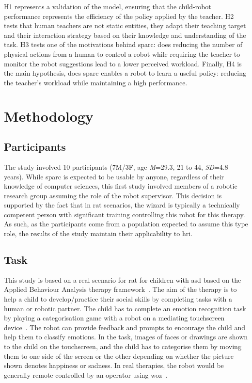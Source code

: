 H1 represents a validation of the model, ensuring that the child-robot performance represents the efficiency of the policy applied by the teacher. H2 tests that human teachers are not static entities, they adapt their teaching target and their interaction strategy based on their knowledge and understanding of the task. H3 tests one of the motivations behind \gls{sparc}: does reducing the number of physical actions from a human to control a robot while requiring the teacher to monitor the robot suggestions lead to a lower perceived workload. Finally, H4 is the main hypothesis, does \gls{sparc} enables a robot to learn a useful policy: reducing the teacher's workload while maintaining a high performance.

\section{Methodology}

\subsection{Participants}

The study involved 10 participants (7M/3F, age \textit{M}=29.3, 21 to 44, \textit{SD}=4.8 years). While \gls{sparc} is expected to be usable by anyone, regardless of their knowledge of computer sciences, this first study involved members of a robotic research group assuming the role of the robot supervisor. This decision is supported by the fact that in \gls{rat} scenarios, the wizard is typically a technically competent person with significant training controlling this robot for this therapy. As such, as the participants come from a population expected to assume this type role, the results of the study maintain their applicability to \gls{hri}.

\subsection{Task}

This study is based on a real scenario for \gls{rat} for children with \gls{asd} based on the Applied Behaviour Analysis therapy framework~\citep{cooper2007applied}. The aim of the therapy is to help a child to develop/practice their social skills by completing tasks with a human or robotic partner. The child has to complete an emotion recognition task by playing a categorisation game with a robot on a mediating touchscreen device~\citep{baxter2012touchscreen}. The robot can provide feedback and prompts to encourage the child and help them to classify emotions. In the task, images of faces or drawings are shown to the child on the touchscreen, and the child has to categorise them by moving them to one side of the screen or the other depending on whether the picture shown denotes happiness or sadness. In real therapies, the robot would be generally remote-controlled by an operator using \gls{woz}~\citep{riek2012wizard}.%

